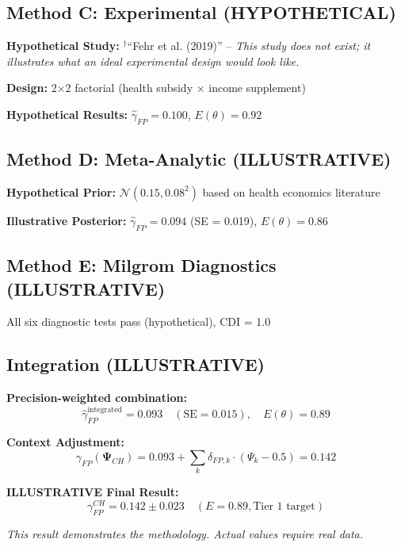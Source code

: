 \documentclass[11pt,a4paper]{article}
\theoremstyle{definition}
\begin{document}
\subsection{Method C: Experimental (HYPOTHETICAL)}

\textbf{Hypothetical Study:} $^\dagger$``Fehr et al. (2019)'' -- \textit{This study does not exist; 
it illustrates what an ideal experimental design would look like.}

\textbf{Design:} 2$\times$2 factorial (health subsidy $\times$ income supplement)

\textbf{Hypothetical Results:} $\hat{\gamma}_{FP} = 0.100$, $E(\theta) = 0.92$

\subsection{Method D: Meta-Analytic (ILLUSTRATIVE)}

\textbf{Hypothetical Prior:} $\mathcal{N}(0.15, 0.08^2)$ based on health economics literature

\textbf{Illustrative Posterior:} $\hat{\gamma}_{FP} = 0.094$ (SE = 0.019), $E(\theta) = 0.86$

\subsection{Method E: Milgrom Diagnostics (ILLUSTRATIVE)}

All six diagnostic tests pass (hypothetical), CDI = 1.0

\subsection{Integration (ILLUSTRATIVE)}

\textbf{Precision-weighted combination:}
\begin{equation}
\hat{\gamma}_{FP}^{\text{integrated}} = 0.093 \quad (\text{SE} = 0.015), \quad E(\theta) = 0.89
\end{equation}

\textbf{Context Adjustment:}
\begin{equation}
\gamma_{FP}(\boldsymbol{\Psi}_{CH}) = 0.093 + \sum_k \delta_{FP,k} \cdot (\Psi_k - 0.5) = 0.142
\end{equation}

\begin{tcolorbox}[colback=green!10!white, colframe=green!75!black]
\textbf{ILLUSTRATIVE Final Result:}
\[
\gamma_{FP}^{CH} = 0.142 \pm 0.023 \quad (E = 0.89, \text{Tier 1 target})
\]

\textit{This result demonstrates the methodology. Actual values require real data.}
\end{tcolorbox}
\end{document}
